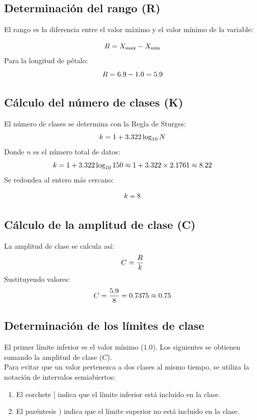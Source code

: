 \documentclass[
  spanish,
  letterpaper,
]{book}
\begin{document}
\subsection{Determinación del rango
(R)}\label{determinaciuxf3n-del-rango-r}

El rango es la diferencia entre el valor máximo y el valor mínimo de la
variable:

\[\huge R = X_{\text{max}} - X_{\text{min}}\] Para la longitud de
pétalo: \[\huge R = 6.9 - 1.0 = 5.9\]

\subsection{Cálculo del número de clases
(K)}\label{cuxe1lculo-del-nuxfamero-de-clases-k}

El número de clases se determina con la Regla de Sturges:
\[\huge k = 1 + 3.322 \log_{10} N\] Donde \(n\) es el número total de
datos:
\[\LARGE k = 1 + 3.322 \log_{10} 150 \approx 1 + 3.322 \times 2.1761 \approx 8.22\]
Se redondea al entero más cercano:

\[\Huge k = 8\]

\subsection{Cálculo de la amplitud de clase
(C)}\label{cuxe1lculo-de-la-amplitud-de-clase-c}

La amplitud de clase se calcula así: \[\Huge C = \frac{R}{k}\]
Sustituyendo valores: \[\Huge C = \frac{5.9}{8} = 0.7375 \approx 0.75\]

\subsection{Determinación de los límites de
clase}\label{determinaciuxf3n-de-los-luxedmites-de-clase}

El primer límite inferior es el valor mínimo (\(1.0\)). Los siguientes
se obtienen sumando la amplitud de clase (\(C\)).\\
Para evitar que un valor pertenezca a dos clases al mismo tiempo, se
utiliza la notación de intervalos semiabiertos:

\begin{enumerate}
\def\labelenumi{\arabic{enumi}.}
\item
  El corchete \([\) indica que el límite inferior está incluido en la
  clase.
\item
  El paréntesis \()\) indica que el límite superior no está incluido en
  la clase.
\end{enumerate}
\end{document}
